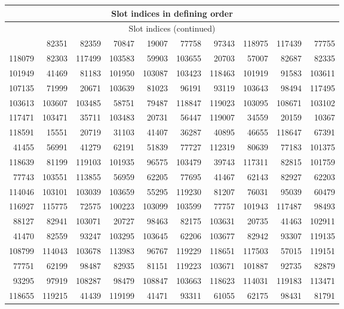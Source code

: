{\scriptsize\setlength{\tabcolsep}{5pt}\begin{longtable}{rrrrrrrrrr}
\toprule\multicolumn{10}{c}{Slot indices in defining order}\\\midrule\endfirsthead
\toprule\multicolumn{10}{c}{Slot indices (continued)}\\\midrule\endhead
\bottomrule\endfoot
20543 & 82351 & 82359 & 70847 & 19007 & 77758 & 97343 & 118975 & 117439 & 77755\\
118079 & 82303 & 117499 & 103583 & 59903 & 103655 & 20703 & 57007 & 82687 & 82335\\
101949 & 41469 & 81183 & 101950 & 103087 & 103423 & 118463 & 101919 & 91583 & 103611\\
107135 & 71999 & 20671 & 103639 & 81023 & 96191 & 93119 & 103643 & 98494 & 117495\\
103613 & 103607 & 103485 & 58751 & 79487 & 118847 & 119023 & 103095 & 108671 & 103102\\
117471 & 103471 & 35711 & 103483 & 20731 & 56447 & 119007 & 34559 & 20159 & 10367\\
118591 & 15551 & 20719 & 31103 & 41407 & 36287 & 40895 & 46655 & 118647 & 67391\\
41455 & 56991 & 41279 & 62191 & 51839 & 77727 & 112319 & 80639 & 77183 & 101375\\
118639 & 81199 & 119103 & 101935 & 96575 & 103479 & 39743 & 117311 & 82815 & 101759\\
77743 & 103551 & 113855 & 56959 & 62205 & 77695 & 41467 & 62143 & 82927 & 62203\\
114046 & 103101 & 103039 & 103659 & 55295 & 119230 & 81207 & 76031 & 95039 & 60479\\
116927 & 115775 & 72575 & 100223 & 103099 & 103599 & 77757 & 101943 & 117487 & 98493\\
88127 & 82941 & 103071 & 20727 & 98463 & 82175 & 103631 & 20735 & 41463 & 102911\\
41470 & 82559 & 93247 & 103295 & 103645 & 62206 & 103677 & 82942 & 93307 & 119135\\
108799 & 114043 & 103678 & 113983 & 96767 & 119229 & 118651 & 117503 & 57015 & 119151\\
77751 & 62199 & 98487 & 82935 & 81151 & 119223 & 103671 & 101887 & 92735 & 82879\\
93295 & 97919 & 108287 & 98479 & 108847 & 103663 & 118623 & 114031 & 119183 & 113471\\
118655 & 119215 & 41439 & 119199 & 41471 & 93311 & 61055 & 62175 & 98431 & 81791\\

\end{longtable}}
